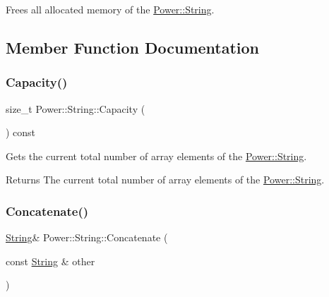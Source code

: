 Frees all allocated memory of the \hyperlink{class_power_1_1_string}{Power\+::\+String}. 



\subsection{Member Function Documentation}
\mbox{\label{class_power_1_1_string_aa25a140140cd4fe69b04d70a794c8394}} 
\subsubsection{\texorpdfstring{Capacity()}{Capacity()}}
{\footnotesize\ttfamily size\+\_\+t Power\+::\+String\+::\+Capacity (\begin{DoxyParamCaption}{ }\end{DoxyParamCaption}) const\hspace{0.3cm}{\ttfamily [inline]}}



Gets the current total number of array elements of the \hyperlink{class_power_1_1_string}{Power\+::\+String}. 

\begin{DoxyReturn}{Returns}
The current total number of array elements of the \hyperlink{class_power_1_1_string}{Power\+::\+String}. 
\end{DoxyReturn}
\mbox{\label{class_power_1_1_string_aca4d6272dba914cf0fa66b69e615d0ab}} 
\subsubsection{\texorpdfstring{Concatenate()}{Concatenate()}\hspace{0.1cm}{\footnotesize\ttfamily [1/4]}}
{\footnotesize\ttfamily \hyperlink{class_power_1_1_string}{String}\& Power\+::\+String\+::\+Concatenate (\begin{DoxyParamCaption}\item[{const \hyperlink{class_power_1_1_string}{String} \&}]{other }\end{DoxyParamCaption})\hspace{0.3cm}{\ttfamily [inline]}}



